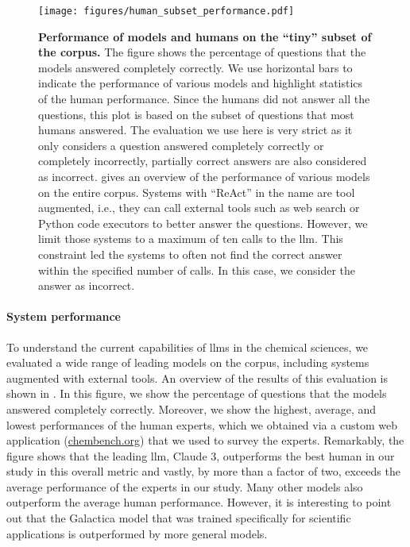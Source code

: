 \documentclass[11pt, oneside]{article}
\begin{document}
\begin{refsection}
\begin{figure}[!h]
    \centering
    \texttt{[image: figures/human\_subset\_performance.pdf]}
    \caption{\textbf{Performance of models and humans on the \enquote{tiny} subset of the  \chembench corpus.} The figure shows the percentage of questions that the models answered completely correctly. We use horizontal bars to indicate the performance of various models and highlight statistics of the human performance. 
    Since the humans did not answer all the questions, this plot is based on the subset of questions that most humans answered.
    The evaluation we use here is very strict as it only considers a question answered completely correctly or completely incorrectly, partially correct answers are also considered as incorrect.
     gives an overview of the performance of various models on the entire corpus.
    Systems with \enquote{ReAct} in the name are tool augmented, i.e., they can call external tools such as web search or Python code executors to better answer the questions.
    However, we limit those systems to a maximum of ten calls to the \gls{llm}. This constraint led the systems to often not find the correct answer within the specified number of calls.
    In this case, we consider the answer as incorrect. 
    }
    \label{fig:human_vs_models_bar}
\end{figure}

\paragraph{System performance} 
To understand the current capabilities of \glspl{llm} in the chemical sciences, we evaluated a wide range of leading models\autocite{Huggingface} on the \chembench corpus, including systems augmented with external tools.
An overview of the results of this evaluation is shown in . 
In this figure, we show the percentage of questions that the models answered completely correctly.
Moreover, we show the highest, average, and lowest performances of the human experts, which we obtained via a custom web application (\url{chembench.org}) that we used to survey the experts.
Remarkably, the figure shows that the leading \gls{llm}, Claude 3, outperforms the best human in our study in this overall metric and vastly, by more than a factor of two, exceeds the average performance of the experts in our study.
Many other models also outperform the average human performance. However, it is interesting to point out that the Galactica model that was trained specifically for scientific applications is outperformed by more general models.


\end{refsection}
\end{document}
